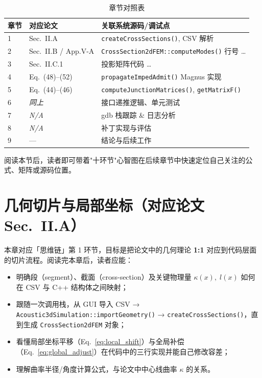 \documentclass{ctexart}
\begin{document}
\begin{table}[h!]
    \centering
    \caption{章节对照表}
    \label{tab:chap-structure}
    \begin{tabular}{p{0.9cm}p{3.5cm}p{7.5cm}}
        \toprule
        章节 & 对应论文 & 关联系统源码/调试点 \\
        \midrule
        1 & Sec.~II.A & \texttt{createCrossSections()}, CSV 解析 \\
        2 & Sec.~II.B / App.V-A & \texttt{CrossSection2dFEM::computeModes()} 行号 \dots \\
        3 & Sec.~II.C.1 & 投影矩阵代码 \dots \\
        4 & Eq.~(48)--(52) & \texttt{propagateImpedAdmit()} Magnus 实现 \\
        5 & Eq.~(44)--(46) & \texttt{computeJunctionMatrices()}, \texttt{getMatrixF()} \\
        6 & \emph{同上} & 接口递推逻辑、单元测试 \\
        7 & \emph{N/A} & gdb 栈跟踪 \& 日志分析 \\
        8 & \emph{N/A} & 补丁实现与评估 \\
        9 & — & 结论与后续工作 \\
        \bottomrule
    \end{tabular}
\end{table}

阅读本节后，读者即可带着"十环节"心智图在后续章节中快速定位自己关注的公式、矩阵或源码位置。

\section{几何切片与局部坐标（对应论文 Sec.~II.A）}
\label{sec:segmentation}
本章对应「思维链」第 1 环节，目标是把论文中的几何理论 \textbf{1:1} 对应到代码层面的切片流程。阅读完本章后，读者应能：
\begin{itemize}
    \item 明确段（segment）、截面（cross-section）及关键物理量 $\kappa(x),\;l(x)$ 如何在 CSV 与 C++ 结构体之间映射；
    \item 跟随一次调用栈，从 GUI 导入 CSV → \texttt{Acoustic3dSimulation::importGeometry()} → \texttt{createCrossSections()}，直到生成 \texttt{CrossSection2dFEM} 对象；
    \item 看懂局部坐标平移（Eq.~\ref{eq:local_shift}）与全局补偿（Eq.~\ref{eq:global_adjust}）在代码中的三行实现并能自己修改容差；
    \item 理解曲率半径/角度计算公式，与论文中中心线曲率 $\kappa$ 的关系。
\end{itemize}
\end{document}
